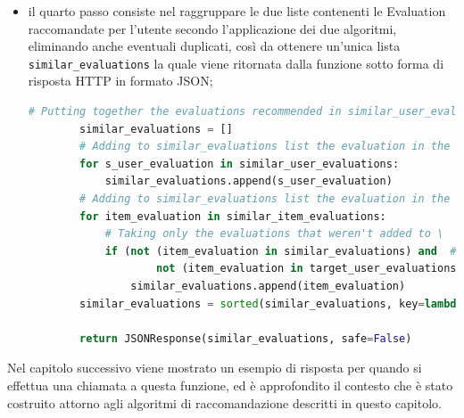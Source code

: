 \begin{itemize}
\begin{lstlisting}[language=Python, label=lst:CF_Hybrid_Evaluation_4]
                # Taking only the evaluations that have: different other_id (excluding the target evaluation
                # in the recommendation) and same parent_id and the evaluations that weren't added to 'similar_item_evaluations'
                # list or to 'similar_user_evaluations' or to 'target_user_evaluations'
                if ((t_user_evaluation['other_id'] != item_evaluation['other_id']) and # Evaluations must have different 'id'
                        (t_user_evaluation['parent_id'] == item_evaluation['parent_id']) and # Evaluations must have the same 'parent_id'
                        # Evaluation in all_other_evals list mustn't be already added to \
                        not (item_evaluation in similar_item_evaluations) and # the 'similar_item_evaluations' list,
                        not (item_evaluation in similar_user_evaluations) and # the 'similar_user_evaluations' list or
                        not (item_evaluation in target_user_evaluations)): # the 'target_user_evaluations' list
                    similar_item_evaluations.append(item_evaluation)
    \end{lstlisting} 
    \item il quarto passo consiste nel raggruppare le due liste contenenti le Evaluation raccomandate per l'utente secondo l'applicazione dei 
    due algoritmi, eliminando anche eventuali duplicati, così da ottenere un'unica lista \texttt{similar\_evaluations} la quale viene ritornata dalla 
    funzione sotto forma di risposta HTTP in formato JSON;
    \begin{lstlisting}[language=Python, label=lst:CF_Hybrid_Evaluation_5]
        # Putting together the evaluations recommended in similar_user_evaluations list and similar_item_evaluations list
        similar_evaluations = []
        # Adding to similar_evaluations list the evaluation in the similar_user_evaluations list
        for s_user_evaluation in similar_user_evaluations:
            similar_evaluations.append(s_user_evaluation)
        # Adding to similar_evaluations list the evaluation in the similar_item_evaluations list
        for item_evaluation in similar_item_evaluations:
            # Taking only the evaluations that weren't added to \
            if (not (item_evaluation in similar_evaluations) and  # the 'similar_evaluations' list or
                    not (item_evaluation in target_user_evaluations)):  # the 'target_user_evaluations' list
                similar_evaluations.append(item_evaluation)
        similar_evaluations = sorted(similar_evaluations, key=lambda i: i['other_id'])
        
        return JSONResponse(similar_evaluations, safe=False)
    \end{lstlisting} 
\end{itemize}
Nel capitolo successivo viene mostrato un esempio di risposta per quando si effettua una chiamata a questa funzione, ed è approfondito il contesto che 
è stato costruito attorno agli algoritmi di raccomandazione descritti in questo capitolo.

